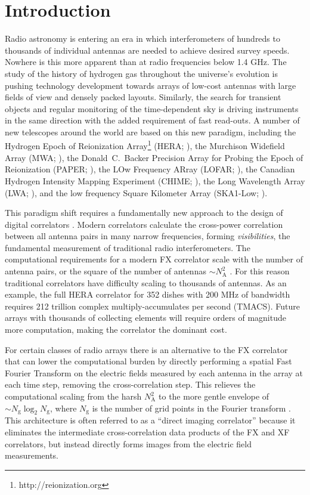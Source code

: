\documentclass[a4paper,fleqn,usenatbib]{mnras}
\newcommand{\Nant}{N_\textrm{A}}
\newcommand{\Ngrid}{N_\textrm{g}}
\begin{document}

\section{Introduction}

Radio astronomy is entering an era in which interferometers of hundreds to thousands of individual antennas are needed to achieve desired survey speeds. Nowhere is this more apparent than at radio frequencies below 1.4 GHz. The study of the history of hydrogen gas throughout the universe's evolution is pushing technology development towards arrays of low-cost antennas with large fields of view and densely packed layouts. Similarly, the search for transient objects and regular monitoring of the time-dependent sky is driving instruments in the same direction with the added requirement of fast read-outs. A number of new telescopes around the world are based on this new paradigm, including the Hydrogen Epoch of Reionization Array\footnote{http://reionization.org} (HERA; \citealt{deb16}), the Murchison Widefield Array (MWA; \citealt{tin13,bow13}), the Donald~C.~Backer Precision Array for Probing the Epoch of Reionization (PAPER; \citealt{par10}), the LOw Frequency ARray (LOFAR; \citealt{van13}), the Canadian Hydrogen Intensity Mapping Experiment (CHIME; \citealt{ban14}), the Long Wavelength Array (LWA; \citealt{ell13}), and the low frequency Square Kilometer Array (SKA1-Low; \citealt{mel13}).

This paradigm shift requires a fundamentally new approach to the design of digital correlators \citep{lon00}. Modern correlators calculate the cross-power correlation between all antenna pairs in many narrow frequencies, forming \emph{visibilities}, the fundamental measurement of traditional radio interferometers. The computational requirements for a modern FX correlator scale with the number of antenna pairs, or the square of the number of antennas $\sim \Nant^2$ \citep{bun04}. For this reason traditional correlators have difficulty scaling to thousands of antennas. As an example, the full HERA correlator for 352 dishes with 200 MHz of bandwidth requires 212 trillion complex multiply-accumulates per second (TMACS). Future arrays with thousands of collecting elements will require orders of magnitude more computation, making the correlator the dominant cost.

For certain classes of radio arrays there is an alternative to the FX correlator that can lower the computational burden by directly performing a spatial Fast Fourier Transform \citep[FFT;][]{coo65} on the electric fields measured by each antenna in the array at each time step, removing the cross-correlation step. This relieves the computational scaling from the harsh $\Nant^2$ to the more gentle envelope of $\sim\Ngrid\log_2\Ngrid$, where $\Ngrid$ is the number of grid points in the Fourier transform \citep[e.g.][]{mor11,teg09,teg10}. This architecture is often referred to as a ``direct imaging correlator'' because it eliminates the intermediate cross-correlation data products of the FX and XF correlators, but instead directly forms images from the electric field measurements.
\end{document}
